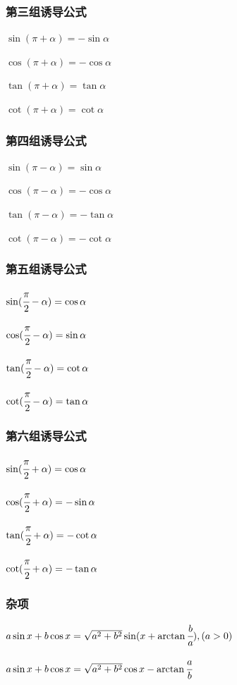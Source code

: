 \documentclass[UTF8,12pt]{ctexbook}
\begin{document}
{{{  \subsubsection{第三组诱导公式}{
    $\sin(\pi + \alpha) = -\sin\alpha$

    $\cos(\pi + \alpha) = -\cos\alpha$

    $\tan(\pi + \alpha) = \tan\alpha$

    $\cot(\pi + \alpha) = \cot\alpha$
  }%

  \subsubsection{第四组诱导公式}{
    $\sin(\pi - \alpha) = \sin\alpha$

    $\cos(\pi - \alpha) = -\cos\alpha$

    $\tan(\pi - \alpha) = -\tan\alpha$

    $\cot(\pi - \alpha) = -\cot\alpha$
  }%

  \subsubsection{第五组诱导公式}{
    $\sin(\cfrac{\pi}{2} - \alpha) = \cos\alpha$

    $\cos(\cfrac{\pi}{2} - \alpha) = \sin\alpha$

    $\tan(\cfrac{\pi}{2} - \alpha) = \cot\alpha$

    $\cot(\cfrac{\pi}{2} - \alpha) = \tan\alpha$
  }%

  \subsubsection{第六组诱导公式}{
    $\sin(\cfrac{\pi}{2} + \alpha) = \cos\alpha$

    $\cos(\cfrac{\pi}{2} + \alpha) = -\sin\alpha$

    $\tan(\cfrac{\pi}{2} + \alpha) = -\cot\alpha$

    $\cot(\cfrac{\pi}{2} + \alpha) = -\tan\alpha$
  }%

  \subsubsection{杂项}{
    $a\sin x + b\cos x = \sqrt{a^2 + b^2}\sin(x + \arctan\cfrac{b}{a}),(a > 0)$

    $a\sin x + b\cos x = \sqrt{a^2 + b^2}\cos x - \arctan\cfrac{a}{b}$

}}}}
\end{document}
